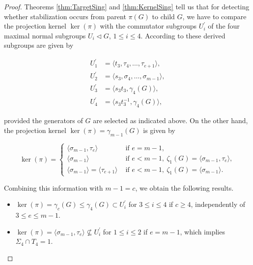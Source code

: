 \documentclass{amsart}
\theoremstyle{definition}
\numberwithin{equation}{section}
\begin{document}
\begin{proof}
Theorems
\ref{thm:TargetSing}
and
\ref{thm:KernelSing}
tell us that
for detecting whether stabilization occurs from parent \(\pi(G)\) to child \(G\),
we have to compare the projection kernel \(\ker(\pi)\)
with the commutator subgroups \(U_i^\prime\)
of the four maximal normal subgroups \(U_i\lhd G\), \(1\le i\le 4\).
According to
\cite[Cor.3.2, p.480]{Ma1}
these derived subgroups are given by

\begin{equation}
\label{eqn:CommSbgOfMaxSbg}
\begin{aligned}
U_1^\prime &= \langle t_3,\tau_4,\ldots,\tau_{e+1}\rangle,\\
U_2^\prime &= \langle s_3,\sigma_4,\ldots,\sigma_{m-1}\rangle,\\
U_3^\prime &= \langle s_3t_3,\gamma_4(G)\rangle,\\
U_4^\prime &= \langle s_3t_3^{-1},\gamma_4(G)\rangle,
\end{aligned}
\end{equation}

\noindent
provided the generators of \(G\) are selected as indicated above.
On the other hand, the projection kernel \(\ker(\pi)=\gamma_{m-1}(G)\) is given by

\begin{equation}
\label{eqn:PrjKer}
\ker(\pi)=
\begin{cases}
\langle\sigma_{m-1},\tau_{e}\rangle & \text{ if } e=m-1, \\
\langle\sigma_{m-1}\rangle & \text{ if } e<m-1,\ \zeta_1(G)=\langle\sigma_{m-1},\tau_{e}\rangle, \\
\langle\sigma_{m-1}\rangle=\langle\tau_{e+1}\rangle & \text{ if } e<m-1,\ \zeta_1(G)=\langle\sigma_{m-1}\rangle.
\end{cases}
\end{equation}

\noindent
Combining this information with \(m-1=c\), we obtain the following results.

\begin{itemize}

\item
\(\ker(\pi)=\gamma_{c}(G)\le\gamma_4(G)\subset U_i^\prime\)
for \(3\le i\le 4\) if \(c\ge 4\), independently of \(3\le e\le m-1\).

\item
\(\ker(\pi)=\langle\sigma_{m-1},\tau_{e}\rangle\not\subseteq U_i^\prime\)
for \(1\le i\le 2\) if \(e=m-1\), which implies \(\Sigma_4\cap T_4=1\).


\end{itemize}
\end{proof}
\end{document}
